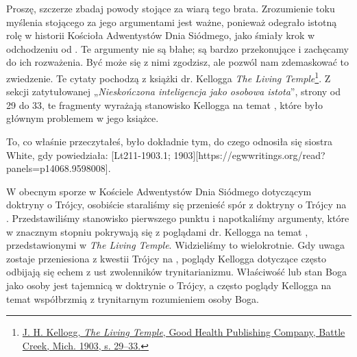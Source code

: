 Proszę, szczerze zbadaj powody stojące za wiarą tego brata. Zrozumienie toku myślenia stojącego za jego argumentami jest ważne, ponieważ odegrało istotną rolę w historii Kościoła Adwentystów Dnia Siódmego, jako śmiały krok w odchodzeniu od . Te argumenty nie są błahe; są bardzo przekonujące i zachęcamy do ich rozważenia. Być może się z nimi zgodzisz, ale pozwól nam zdemaskować to zwiedzenie. Te cytaty pochodzą z książki dr. Kellogga \textit{The Living Temple}\footnote{\href{https://archive.org/details/J.H.Kellogg.TheLivingTemple1903}{J. H. Kellogg, \textit{The Living Temple}, Good Health Publishing Company, Battle Creek, Mich. 1903, s. 29--33.}}. Z sekcji zatytułowanej „\textit{Nieskończona inteligencja jako osobowa istota}”, strony od 29 do 33, te fragmenty wyrażają stanowisko Kellogga na temat , które było głównym problemem w jego książce.

To, co właśnie przeczytałeś, było dokładnie tym, do czego odnosiła się siostra White, gdy powiedziała: [Lt211-1903.1; 1903][https://egwwritings.org/read?panels=p14068.9598008].

W obecnym sporze w Kościele Adwentystów Dnia Siódmego dotyczącym doktryny o Trójcy, osobiście staraliśmy się przenieść spór z doktryny o Trójcy na . Przedstawiliśmy stanowisko pierwszego punktu  i napotkaliśmy argumenty, które w znacznym stopniu pokrywają się z poglądami dr. Kellogga na temat , przedstawionymi w \textit{The Living Temple}. Widzieliśmy to wielokrotnie. Gdy uwaga zostaje przeniesiona z kwestii Trójcy na , poglądy Kellogga dotyczące  często odbijają się echem z ust zwolenników trynitarianizmu. Właściwość lub stan Boga jako osoby jest tajemnicą w doktrynie o Trójcy, a często poglądy Kellogga na temat  współbrzmią z trynitarnym rozumieniem osoby Boga.

